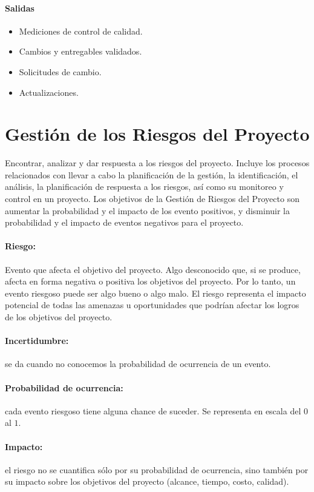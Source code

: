 \documentclass[a4paper,twosides]{article}
\newlength{\wideitemsep}
\let\olditem\item
\renewcommand{\item}{\setlength{\itemsep}{\wideitemsep}\olditem}
\begin{document}
\paragraph{Salidas}
\begin{itemize}
\item Mediciones de control de calidad.
\item Cambios y entregables validados.
\item Solicitudes de cambio.
\item Actualizaciones.
\end{itemize}

\section{Gestión de los Riesgos del Proyecto}
Encontrar, analizar y dar respuesta a los riesgos del proyecto. Incluye los procesos relacionados con llevar a cabo la planificación de la gestión, la identificación, el análisis, la planificación de respuesta a los riesgos, así como su monitoreo y control en un proyecto. Los objetivos de la Gestión de Riesgos del Proyecto son aumentar la probabilidad y el impacto de los evento positivos, y disminuir la probabilidad y el impacto de eventos negativos para el proyecto.
\paragraph{Riesgo:} Evento que afecta el objetivo del proyecto. Algo desconocido que, si se produce, afecta en forma negativa o positiva los objetivos del proyecto. Por lo tanto, un evento riesgoso puede ser algo bueno o algo malo. El riesgo representa el impacto potencial de todas las amenazas u oportunidades que podrían afectar los logros de los objetivos del proyecto.
\paragraph{Incertidumbre:} se da cuando no conocemos la probabilidad de ocurrencia de un evento.
\paragraph{Probabilidad de ocurrencia:} cada evento riesgoso tiene alguna chance de suceder. Se representa en escala del $0$ al $1$.
\paragraph{Impacto:} el riesgo no se cuantifica sólo por su probabilidad de ocurrencia, sino también por su impacto sobre los objetivos del proyecto (alcance, tiempo, costo, calidad).
\end{document}

